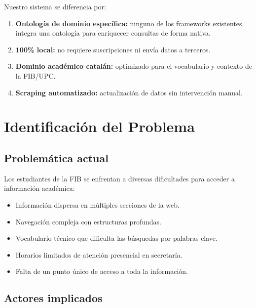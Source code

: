\documentclass[12pt, a4paper, twoside]{report}
\begin{document}
Nuestro sistema se diferencia por:

\begin{enumerate}
  \item \textbf{Ontolog\'ia de dominio espec\'ifica:} ninguno de los frameworks existentes integra una ontolog\'ia para enriquecer consultas de forma nativa.
  \item \textbf{100\% local:} no requiere suscripciones ni env\'ia datos a terceros.
  \item \textbf{Dominio acad\'emico catal\'an:} optimizado para el vocabulario y contexto de la FIB/UPC.
  \item \textbf{Scraping automatizado:} actualizaci\'on de datos sin intervenci\'on manual.
\end{enumerate}


\chapter{Identificaci\'on del Problema}
\label{ch:problema}

\section{Problem\'atica actual}

Los estudiantes de la FIB se enfrentan a diversas dificultades para acceder a informaci\'on acad\'emica:

\begin{itemize}
  \item Informaci\'on dispersa en m\'ultiples secciones de la web.
  \item Navegaci\'on compleja con estructuras profundas.
  \item Vocabulario t\'ecnico que dificulta las b\'usquedas por palabras clave.
  \item Horarios limitados de atenci\'on presencial en secretar\'ia.
  \item Falta de un punto \'unico de acceso a toda la informaci\'on.
\end{itemize}

\section{Actores implicados}
\end{document}

